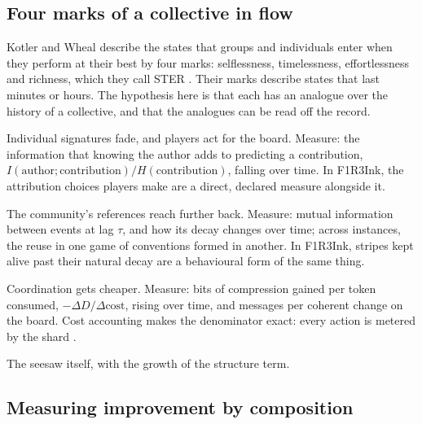 \documentclass[11pt,a4paper]{article}
\begin{document}
\subsection{Four marks of a collective in flow}

Kotler and Wheal describe the states that groups and individuals enter when they perform at their
best by four marks: selflessness, timelessness, effortlessness and richness, which they call STER
\cite{stealingfire}. Their marks describe states that last minutes or hours. The hypothesis here is
that each has an analogue over the history of a collective, and that the analogues can be read off
the record.

\begin{description}[leftmargin=1.2em,itemsep=4pt,font=\normalfont\spartansemi]
\item[Selflessness.] Individual signatures fade, and players act for the board. Measure: the
  information that knowing the author adds to predicting a contribution,
  $I(\text{author};\text{contribution})/H(\text{contribution})$, falling over time. In F1R3Ink, the
  attribution choices players make are a direct, declared measure alongside it.
\item[Timelessness.] The community's references reach further back. Measure: mutual information
  between events at lag $\tau$, and how its decay changes over time; across instances, the reuse in
  one game of conventions formed in another. In F1R3Ink, stripes kept alive past their natural
  decay are a behavioural form of the same thing.
\item[Effortlessness.] Coordination gets cheaper. Measure: bits of compression gained per token
  consumed, $-\Delta D/\Delta\text{cost}$, rising over time, and messages per coherent change on the board. Cost
  accounting makes the denominator exact: every action is metered by the shard
  \cite{cost-rho}.
\item[Richness.] The seesaw itself, with the growth of the structure term.
\end{description}

\subsection{Measuring improvement by composition}\label{sec:composition-measure}
\end{document}
